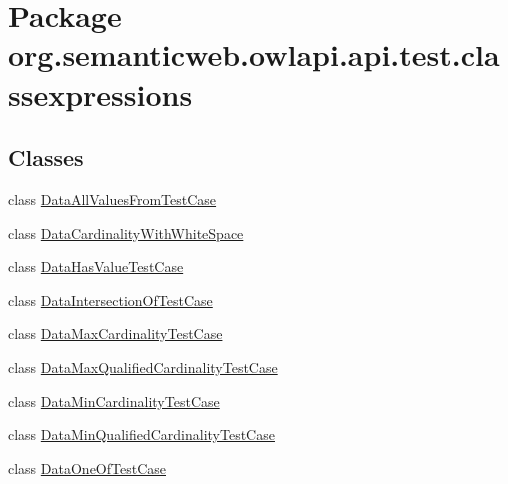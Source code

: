 \hypertarget{namespaceorg_1_1semanticweb_1_1owlapi_1_1api_1_1test_1_1classexpressions}{\section{Package org.\-semanticweb.\-owlapi.\-api.\-test.\-classexpressions}
\label{namespaceorg_1_1semanticweb_1_1owlapi_1_1api_1_1test_1_1classexpressions}
}
\subsection*{Classes}
\begin{DoxyCompactItemize}
\item 
class \hyperlink{classorg_1_1semanticweb_1_1owlapi_1_1api_1_1test_1_1classexpressions_1_1_data_all_values_from_test_case}{Data\-All\-Values\-From\-Test\-Case}
\item 
class \hyperlink{classorg_1_1semanticweb_1_1owlapi_1_1api_1_1test_1_1classexpressions_1_1_data_cardinality_with_white_space}{Data\-Cardinality\-With\-White\-Space}
\item 
class \hyperlink{classorg_1_1semanticweb_1_1owlapi_1_1api_1_1test_1_1classexpressions_1_1_data_has_value_test_case}{Data\-Has\-Value\-Test\-Case}
\item 
class \hyperlink{classorg_1_1semanticweb_1_1owlapi_1_1api_1_1test_1_1classexpressions_1_1_data_intersection_of_test_case}{Data\-Intersection\-Of\-Test\-Case}
\item 
class \hyperlink{classorg_1_1semanticweb_1_1owlapi_1_1api_1_1test_1_1classexpressions_1_1_data_max_cardinality_test_case}{Data\-Max\-Cardinality\-Test\-Case}
\item 
class \hyperlink{classorg_1_1semanticweb_1_1owlapi_1_1api_1_1test_1_1classexpressions_1_1_data_max_qualified_cardinality_test_case}{Data\-Max\-Qualified\-Cardinality\-Test\-Case}
\item 
class \hyperlink{classorg_1_1semanticweb_1_1owlapi_1_1api_1_1test_1_1classexpressions_1_1_data_min_cardinality_test_case}{Data\-Min\-Cardinality\-Test\-Case}
\item 
class \hyperlink{classorg_1_1semanticweb_1_1owlapi_1_1api_1_1test_1_1classexpressions_1_1_data_min_qualified_cardinality_test_case}{Data\-Min\-Qualified\-Cardinality\-Test\-Case}
\item 
class \hyperlink{classorg_1_1semanticweb_1_1owlapi_1_1api_1_1test_1_1classexpressions_1_1_data_one_of_test_case}{Data\-One\-Of\-Test\-Case}

\end{DoxyCompactItemize}
